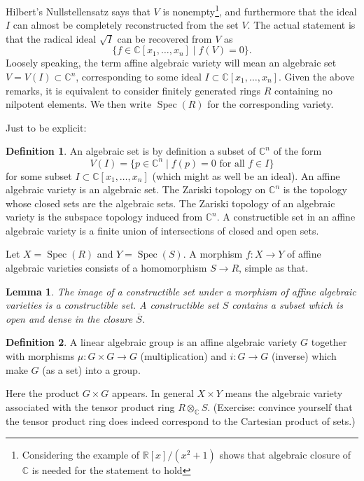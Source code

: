 \documentclass[12pt]{article}
\theoremstyle{plain}
\newtheorem{lemma}[thm]{Lemma}
\theoremstyle{definition}
\newtheorem{defn}{Definition}[section]
\numberwithin{equation}{section}
\DeclareMathOperator{\spec}{Spec}
\newcommand{\ov}[1]{\overline#1}
\newcommand{\C}{\mathbb{C}}
\newcommand{\R}{\mathbb{R}}
\begin{document}
Hilbert's Nullstellensatz says that $V$ is nonempty\footnote{Considering the example of $\R[x] / (x^2+1)$ shows that algebraic closure of $\C$ is needed for the statement to hold}, and furthermore that the ideal $I$ can almost be completely reconstructed from the set $V$. The actual statement is that the radical ideal $\sqrt{I}$ can be recovered from $V$ as
\[
\{f \in \C[x_1, \ldots, x_n] \mid f(V) = 0\}.
\]
Loosely speaking, the term affine algebraic variety will mean an algebraic set $V = V(I) \subset \C^n$, corresponding to some ideal $I \subset \C[x_1, \ldots, x_n]$. Given the above remarks, it is equivalent to consider finitely generated rings $R$ containing no nilpotent elements. We then write $\spec(R)$ for the corresponding variety.

Just to be explicit:
\begin{defn}
An algebraic set is by definition a subset of $\C^n$ of the form
\[
V(I) = \{p \in \C^n \mid \text{$f(p) = 0$ for all $f \in I$}\}
\]
for some subset $I \subset \C[x_1, \ldots, x_n]$ (which might as well be an ideal). An affine algebraic variety is an algebraic set. The Zariski topology on $\C^n$ is the topology whose closed sets are the algebraic sets. The Zariski topology of an algebraic variety is the subspace topology induced from $\C^n$. A constructible set in an affine algebraic variety is a finite union of intersections of closed and open sets.
\end{defn}


Let $X = \spec(R)$ and $Y = \spec(S)$. A morphism $f : X \rightarrow Y$ of affine algebraic varieties consists of a homomorphism $S \rightarrow R$, simple as that.

\begin{lemma}
The image of a constructible set under a morphism of affine algebraic varieties is a constructible set. A constructible set $S$ contains a subset which is open and dense in the closure $\ov S$.
\end{lemma}


\begin{defn}
A linear algebraic group is an affine algebraic variety $G$ together with morphisms $\mu : G \times G \rightarrow G$ (multiplication) and $i : G \rightarrow G$ (inverse) which make $G$ (as a set) into a group.
\end{defn}
Here the product $G \times G$ appears. In general $X \times Y$ means the algebraic variety associated with the tensor product ring $R \otimes_\C S$. (Exercise: convince yourself that the tensor product ring does indeed correspond to the Cartesian product of sets.)
\end{document}
